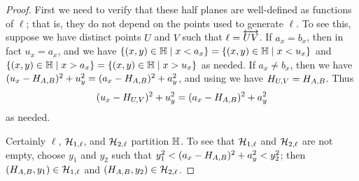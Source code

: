 \begin{proof}
First we need to verify that these half planes are well-defined as functions of \(\ell\); that is, they do not depend on the points used to generate \(\ell\).
To see this, suppose we have distinct points \(U\) and \(V\) such that \(\ell = \overleftrightarrow{UV}\).
If \(a_x = b_x\), then in fact \(u_x = a_x\), and we have \( \{ (x,y) \in \mathbb{H} \mid x < a_x \} = \{ (x,y) \in \mathbb{H} \mid x < u_x \} \) and \( \{ (x,y) \in \mathbb{H} \mid x > a_x \} = \{ (x,y) \in \mathbb{H} \mid x > u_x \} \) as needed.
If \(a_x \neq b_x\), then we have \((u_x - H_{A,B})^2 + u_y^2 = (a_x - H_{A,B})^2 + a_y^2\), and using  we have \(H_{U,V} = H_{A,B}\).
Thus \[ (u_x - H_{U,V})^2 + u_y^2 = (a_x - H_{A,B})^2 + a_y^2 \] as needed.

Certainly \(\ell\), \(\mathcal{H}_{1,\ell}\), and \(\mathcal{H}_{2,\ell}\) partition \(\mathbb{H}\).
To see that \(\mathcal{H}_{1,\ell}\) and \(\mathcal{H}_{2,\ell}\) are not empty, choose \(y_1\) and \(y_2\) such that \(y_1^2 < (a_x - H_{A,B})^2 + a_y^2 < y_2^2\); then \((H_{A,B},y_1) \in \mathcal{H}_{1,\ell}\) and \((H_{A,B},y_2) \in \mathcal{H}_{2,\ell}\).


\end{proof}

